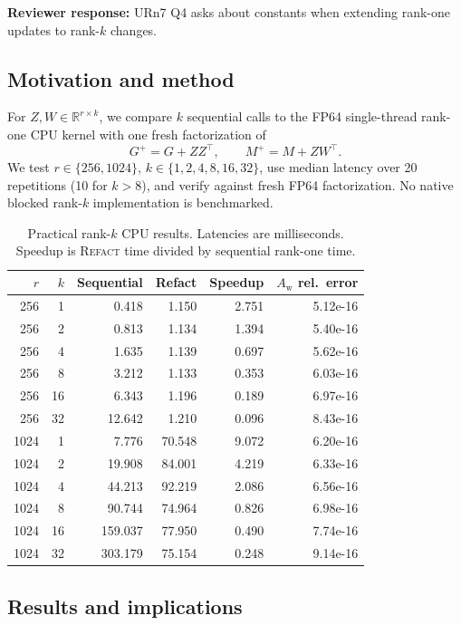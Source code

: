 \documentclass[11pt]{article}
\newcommand{\refact}{\textsc{Refact}}
\newcommand{\Aw}{A_{\mathrm w}}
\newcommand{\R}{\mathbb{R}}
\newcommand{\reviewer}[1]{\textbf{Reviewer response:} #1}
\begin{document}
\reviewer{URn7 Q4 asks about constants when extending rank-one updates to
rank-\(k\) changes.}

\subsection{Motivation and method}

For \(Z,W\in\R^{r\times k}\), we compare \(k\) sequential calls to the FP64
single-thread rank-one CPU kernel with one fresh factorization of
\[
  G^+=G+ZZ^\top,\qquad M^+=M+ZW^\top.
\]
We test \(r\in\{256,1024\}\), \(k\in\{1,2,4,8,16,32\}\), use median latency
over 20 repetitions (10 for \(k>8\)), and verify against fresh FP64
factorization.  No native blocked rank-\(k\) implementation is benchmarked.

\begin{table}[ht]
\centering
\small
\caption{Practical rank-\(k\) CPU results.  Latencies are milliseconds.
Speedup is \refact{} time divided by sequential rank-one time.}
\label{tab:e6}
\begin{tabular}{@{}rrrrrr@{}}
\toprule
\(r\) & \(k\) & Sequential & Refact & Speedup & \(\Aw\) rel.\ error \\
\midrule
256 & 1  & 0.418 & 1.150 & 2.751 & 5.12e-16 \\
256 & 2  & 0.813 & 1.134 & 1.394 & 5.40e-16 \\
256 & 4  & 1.635 & 1.139 & 0.697 & 5.62e-16 \\
256 & 8  & 3.212 & 1.133 & 0.353 & 6.03e-16 \\
256 & 16 & 6.343 & 1.196 & 0.189 & 6.97e-16 \\
256 & 32 & 12.642 & 1.210 & 0.096 & 8.43e-16 \\
\midrule
1024 & 1  & 7.776 & 70.548 & 9.072 & 6.20e-16 \\
1024 & 2  & 19.908 & 84.001 & 4.219 & 6.33e-16 \\
1024 & 4  & 44.213 & 92.219 & 2.086 & 6.56e-16 \\
1024 & 8  & 90.744 & 74.964 & 0.826 & 6.98e-16 \\
1024 & 16 & 159.037 & 77.950 & 0.490 & 7.74e-16 \\
1024 & 32 & 303.179 & 75.154 & 0.248 & 9.14e-16 \\
\bottomrule
\end{tabular}
\end{table}

\subsection{Results and implications}
\end{document}
